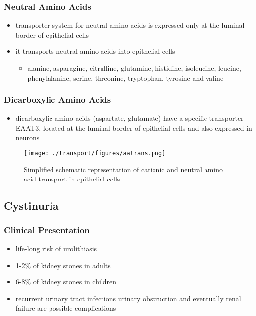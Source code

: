 \documentclass{scrartcl}
\begin{document}
\subsubsection{Neutral  Amino Acids}
\label{sec:org8b2cbf8}
\begin{itemize}
\item transporter system for neutral amino acids is expressed only
at the luminal border of epithelial cells
\item it transports neutral amino acids into epithelial cells
\begin{itemize}
\item alanine, asparagine, citrulline, glutamine, histidine, isoleucine,
leucine, phenylalanine, serine, threonine, tryptophan, tyrosine
and valine
\end{itemize}
\end{itemize}
\subsubsection{Dicarboxylic Amino Acids}
\label{sec:org7e7bed7}
\begin{itemize}
\item dicarboxylic amino acids (aspartate, glutamate) have a specific
transporter EAAT3, located at the luminal border
of epithelial cells and also expressed in neurons
\end{itemize}

\begin{figure}[htbp]
\centering
\texttt{[image: ./transport/figures/aatrans.png]}
\caption{\label{fig:orga79bf2c}
Simplified schematic representation of cationic and neutral amino acid transport in epithelial cells}
\end{figure}

\subsection{Cystinuria}
\label{sec:orgba8d581}
\subsubsection{Clinical Presentation}
\label{sec:orga924967}
\begin{itemize}
\item life-long risk of urolithiasis
\item 1-2\% of kidney stones in adults
\item 6-8\% of kidney stones in children
\item recurrent urinary tract infections urinary obstruction and
eventually renal failure are possible complications
\end{itemize}
\end{document}
